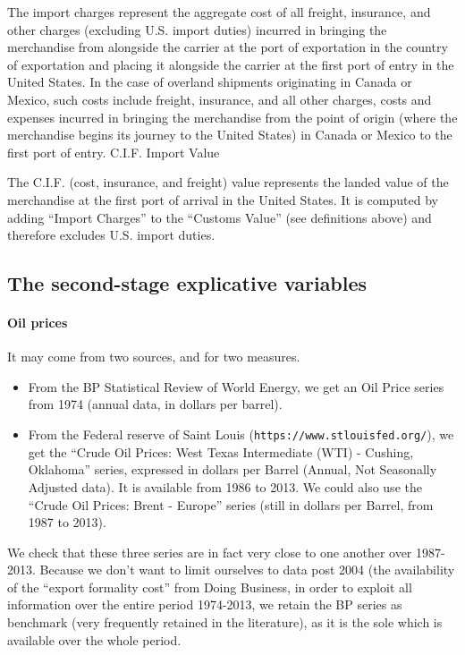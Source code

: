 \documentclass[a4paper,11pt]{article}
\begin{document}
The import charges represent the aggregate cost of all freight, insurance, and other charges (excluding U.S. import duties) incurred in bringing the merchandise from alongside the carrier at the port of exportation in the country of exportation and placing it alongside the carrier at the first port of entry in the United States. In the case of overland shipments originating in Canada or Mexico, such costs include freight, insurance, and all other charges, costs and expenses incurred in bringing the merchandise from the point of origin (where the merchandise begins its journey to the United States) in Canada or Mexico to the first port of entry.
C.I.F. Import Value

The C.I.F. (cost, insurance, and freight) value represents the landed value of the merchandise at the first port of arrival in the United States. It is computed by adding ``Import Charges'' to the ``Customs Value'' (see definitions above) and therefore excludes U.S. import duties.

\subsection{The second-stage explicative variables}

\paragraph{Oil prices} It may come from two sources, and for two measures.
\begin{itemize}
\item From the BP Statistical Review of World Energy, we get an Oil Price series from 1974 (annual data, in dollars per barrel).
\item From the Federal reserve of Saint Louis (\texttt{https://www.stlouisfed.org/}), we get the ``Crude Oil Prices: West Texas Intermediate (WTI) - Cushing, Oklahoma'' series, expressed in dollars per Barrel (Annual, Not Seasonally Adjusted data). It is available from 1986 to 2013. We could also use the ``Crude Oil Prices: Brent - Europe'' series (still in dollars per Barrel, from 1987 to 2013).

\end{itemize}

We check that these three series are in fact very close to one another over 1987-2013. Because we don't want to limit ourselves to data post 2004 (the availability of the ``export formality cost'' from Doing Business, in order to exploit all information over the entire period 1974-2013, we retain the BP series as benchmark (very frequently retained in the literature), as it is the sole which is available over the whole period.
\end{document}
